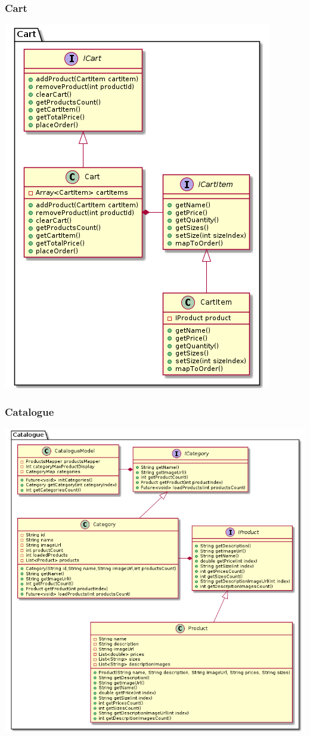 \documentclass{article}
\begin{document}
\subsubsection{Cart}
\includegraphics[scale=0.5]{./out/MobileApp/Domain/Cart/Cart.png}\\

\subsubsection{Catalogue}
\includegraphics[scale=0.5]{./out/MobileApp/Domain/Catalogue/Catalogue.png}
\end{document}
